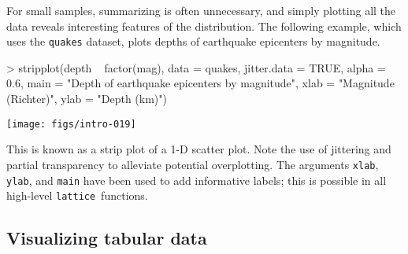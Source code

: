 \documentclass[10pt]{article}
\newcommand{\code}[1]{\texttt{#1}}
\newcommand{\lattice}{\code{lattice}}
\begin{document}
\newpage


For small samples, summarizing is often unnecessary, and simply
plotting all the data reveals interesting features of the
distribution.  The following example, which uses the \code{quakes}
dataset, plots depths of earthquake epicenters by magnitude.
\begin{Schunk}
\begin{Sinput}
> stripplot(depth ~ factor(mag), data = quakes,
            jitter.data = TRUE, alpha = 0.6, 
            main = "Depth of earthquake epicenters by magnitude",
            xlab = "Magnitude (Richter)",
            ylab = "Depth (km)")
\end{Sinput}
\end{Schunk}
\begin{center}
\texttt{[image: figs/intro-019]}
\end{center}
This is known as a strip plot of a 1-D scatter plot.  Note the use of
jittering and partial transparency to alleviate potential
overplotting.  The arguments \code{xlab}, \code{ylab}, and \code{main}
have been used to add informative labels; this is possible in all
high-level \lattice\ functions.



\newpage

\subsection*{Visualizing tabular data}
\end{document}
